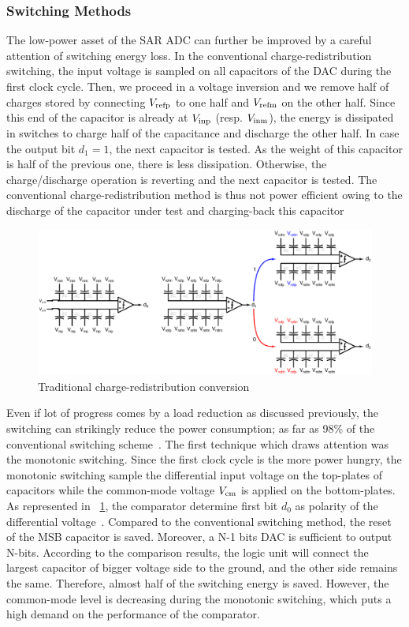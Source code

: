 \subsubsection{Switching Methods}
\label{sec:sar-switching}
The low-power asset of the SAR ADC can further be improved by a careful attention of switching energy loss. In the conventional charge-redistribution switching, the input voltage is sampled on all capacitors of the DAC during the first clock cycle. Then, we proceed in a voltage inversion and we remove half of charges stored by connecting $V_{\rm refp}$ to one half and $V_{\rm refm}$ on the other half. Since this end of the capacitor is already at $V_{\rm inp}$ (resp. $V_{\rm inm}$), the energy is dissipated in switches to charge half of the capacitance and discharge the other half. In case the output bit $d_1 = 1$, the next capacitor is tested. As the weight of this capacitor is half of the previous one, there is less dissipation. Otherwise, the charge/discharge operation is reverting and the next capacitor is tested. The conventional charge-redistribution method is thus not power efficient owing to the discharge of the capacitor under test and charging-back this capacitor~\cite{Ginsburg2005}

\begin{figure}[htp]
	\centering
	\includegraphics[width=\textwidth]{Chapter2/Figs/Vector/conv-charge-redis.ps}
	\caption{Traditional charge-redistribution conversion}
	\label{fig:sar_vcm_monotonic}
\end{figure}

Even if lot of progress comes by a load reduction as discussed previously, the switching can strikingly reduce the power consumption; as far as 98\% of the conventional switching scheme~\cite{Zhu2013,Xie2014,Li2016}. The first technique which draws attention was the monotonic switching. Since the first clock cycle is the more power hungry, the monotonic switching sample the differential input voltage on the top-plates of capacitors while the common-mode voltage \(V_{\rm cm}\) is applied on the bottom-plates. As represented in \figurename~\ref{fig:sar_vcm_monotonic}, the comparator determine first bit \(d_0\) as polarity of the differential voltage~\cite{Ginsburg2005}. Compared to the conventional switching method, the reset of the MSB capacitor is saved. Moreover, a N-1 bits DAC is sufficient to output N-bits.  According to the comparison results, the logic unit will connect the largest capacitor of bigger voltage side to the ground, and the other side remains the same. Therefore, almost half of the switching energy is saved. However, the common-mode level is decreasing during the monotonic switching, which puts a high demand on the performance of the comparator.

